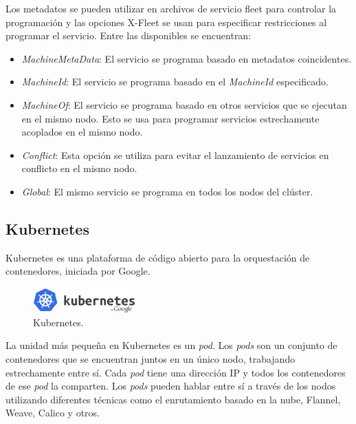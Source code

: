 Los metadatos se pueden utilizar en archivos de servicio fleet para controlar la programación y las opciones X-Fleet se usan para especificar restricciones al programar el servicio. Entre las disponibles se encuentran:
\begin{itemize}
\item \textit{MachineMetaData}: El servicio se programa basado en metadatos coincidentes.
\item \textit{MachineId}: El servicio se programa basado en el \textit{MachineId} especificado.
\item \textit{MachineOf}: El servicio se programa basado en otros servicios que se ejecutan en el mismo nodo. Esto se usa para programar servicios estrechamente acoplados en el mismo nodo.
\item \textit{Conflict}: Esta opción se utiliza para evitar el lanzamiento de servicios en conflicto en el mismo nodo.
\item \textit{Global}: El mismo servicio se programa en todos los nodos del clúster.
\end{itemize}

\subsection{Kubernetes}

Kubernetes es una plataforma de código abierto para la orquestación de contenedores, iniciada por Google.

\begin{figure}[H]
\centering
\includegraphics[width=0.35\textwidth]{images/figures/kubernetes.png}
\caption{Kubernetes.\footnotemark}
\end{figure}


La unidad más pequeña en Kubernetes es un \textit{pod}. Los \textit{pods} son un conjunto de contenedores que se encuentran juntos en un único nodo, trabajando estrechamente entre sí. Cada \textit{pod} tiene una dirección IP y todos los contenedores de ese \textit{pod} la comparten. Los \textit{pods} pueden hablar entre sí a través de los nodos utilizando diferentes técnicas como el enrutamiento basado en la nube, Flannel, Weave, Calico y otros.


